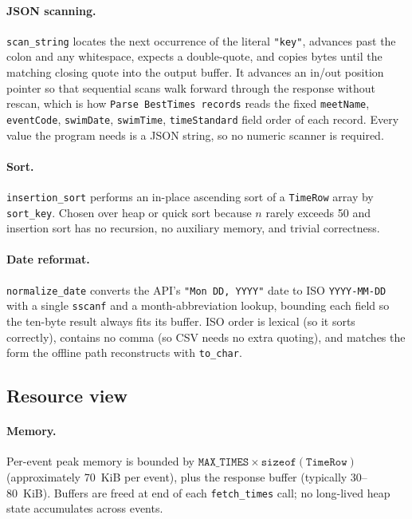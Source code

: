 \documentclass[12pt]{article}
\newcommand{\code}[1]{\texttt{#1}}
\begin{document}
\paragraph{JSON scanning.}
\code{scan\_string} locates the next occurrence of the literal
\code{"key"}, advances past the colon and any whitespace, expects
a double-quote, and copies bytes until the matching closing quote
into the output buffer.  It advances an in/out position pointer so
that sequential scans walk forward through the response without
rescan, which is how \code{Parse BestTimes records} reads the fixed
\code{meetName}, \code{eventCode}, \code{swimDate}, \code{swimTime},
\code{timeStandard} field order of each record.  Every value the
program needs is a JSON string, so no numeric scanner is required.

\paragraph{Sort.}
\code{insertion\_sort} performs an in-place ascending sort of a
\code{TimeRow} array by \code{sort\_key}.  Chosen over heap or
quick sort because $n$ rarely exceeds 50 and insertion sort has
no recursion, no auxiliary memory, and trivial correctness.

\paragraph{Date reformat.}
\code{normalize\_date} converts the API's \code{"Mon DD, YYYY"} date
to ISO \code{YYYY-MM-DD} with a single \code{sscanf} and a
month-abbreviation lookup, bounding each field so the ten-byte result
always fits its buffer.  ISO order is lexical (so it sorts correctly),
contains no comma (so CSV needs no extra quoting), and matches the form
the offline path reconstructs with \code{to\_char}.

\subsection{Resource view}

\paragraph{Memory.}
Per-event peak memory is bounded by
$\code{MAX\_TIMES} \times \mathtt{sizeof}(\code{TimeRow})$
(approximately 70~KiB per event), plus the response buffer
(typically 30--80~KiB).  Buffers are freed at end of each
\code{fetch\_times} call; no long-lived heap state accumulates
across events.
\end{document}

